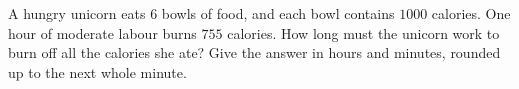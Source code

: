 A hungry unicorn eats $6$ bowls of food, and each bowl contains $1000$ calories. One hour of moderate labour burns $755$ calories. How long must the unicorn work to burn off all the calories she ate? Give the answer in hours and minutes, rounded up to the next whole minute.
